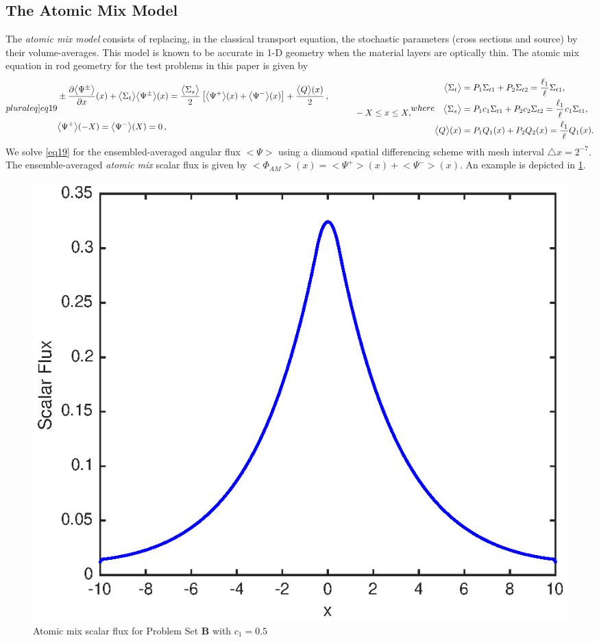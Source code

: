 \documentclass[12pt]{article}
\newcommand{\bl}{\big<}
\newcommand{\bg}{\big>}
\begin{document}
\subsection{The Atomic Mix Model}

The {\em atomic mix model} \cite{pom91,dum00} consists of replacing, in the classical transport equation, the stochastic parameters (cross sections and source) by their volume-averages.
This model is known to be accurate in 1-D geometry when the material layers are optically thin.
The atomic mix equation in rod geometry for the test problems in this paper is given by
\begin{subequations}\label[pluraleq]{eq19}
\begin{align}\label{eq19a}
&\pm \frac{\partial \bl\Psi^{\pm}\bg}{\partial x}(x) + \bl\Sigma_t\bg\bl\Psi^{\pm}\bg(x) 
= \frac{\bl\Sigma_s\bg}{2}\left[\bl\Psi^{+}\bg(x)+\bl\Psi^{-}\bg(x)\right]+ \frac{\bl Q\bg(x)}{2}\,,\\
& \hspace{12cm} -X\leq x\leq X,\nonumber\\
&\bl\Psi^+\bg(-X) = \bl\Psi^-\bg(X) = 0\,,
\end{align}
where 
\begin{align}
\bl\Sigma_t\bg &= P_1\Sigma_{t1} + P_2\Sigma_{t2} = \frac{\ell_1}{\ell}\Sigma_{t1},\\
\bl\Sigma_s\bg &= P_1c_1\Sigma_{t1} + P_2c_2\Sigma_{t2} = \frac{\ell_1}{\ell}c_1\Sigma_{t1},\\
\bl Q\bg(x) &= P_1 Q_1(x) + P_2 Q_2(x) = \frac{\ell_1}{\ell}Q_1(x). \label{eq19e}
\end{align}
\end{subequations}
We solve \cref{eq19} for the ensembled-averaged angular flux $\bl\Psi\bg$ using a diamond spatial differencing scheme with mesh interval $\triangle x=2^{-7}$.
The ensemble-averaged {\em atomic mix} scalar flux is given by $\bl\Phi_{AM}\bg(x) = \bl\Psi^+\bg(x)+\bl\Psi^-\bg(x)$. An example is depicted in \cref{fig5}.
\begin{figure}[htb]
  \centering
  \includegraphics[scale=1]{fig5.eps}
  \caption{Atomic mix scalar flux for Problem Set {\bf B} with $c_1=0.5$}
  \label{fig5}
\end{figure}
\end{document}
